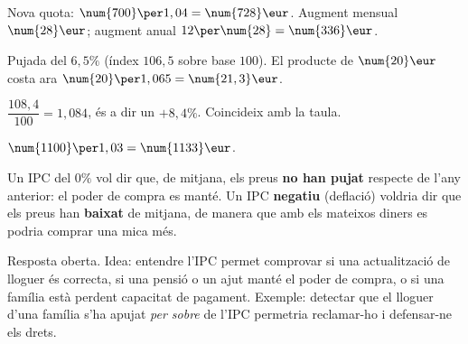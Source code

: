 \begin{solucions}
\begin{sollist}
  \item Nova quota: $\num{700}\per 1,04=\num{728}\eur$. Augment mensual $\num{28}\eur$;
        augment anual $12\per\num{28}=\num{336}\eur$.
  \item Pujada del $6,5\%$ (índex $106,5$ sobre base $100$). El producte de
        $\num{20}\eur$ costa ara $\num{20}\per 1,065=\num{21,3}\eur$.
  \item $\dfrac{108,4}{100}=1,084$, és a dir un $+8,4\%$. Coincideix amb la taula.
  \item $\num{1100}\per 1,03=\num{1133}\eur$.
  \item Un IPC del $0\%$ vol dir que, de mitjana, els preus \textbf{no han pujat}
        respecte de l'any anterior: el poder de compra es manté. Un IPC
        \textbf{negatiu} (deflació) voldria dir que els preus han \textbf{baixat} de
        mitjana, de manera que amb els mateixos diners es podria comprar una mica més.
  \item Resposta oberta. Idea: entendre l'IPC permet comprovar si una actualització de
        lloguer és correcta, si una pensió o un ajut manté el poder de compra, o si una
        família està perdent capacitat de pagament. Exemple: detectar que el lloguer
        d'una família s'ha apujat \emph{per sobre} de l'IPC permetria reclamar-ho i
        defensar-ne els drets.
\end{sollist}
\end{solucions}
